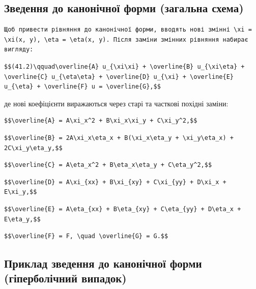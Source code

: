 \documentclass[
  ukrainian,
]{article}
\begin{document}
\subsection{Зведення до канонічної форми (загальна
схема)}\label{ux437ux432ux435ux434ux435ux43dux43dux44f-ux434ux43e-ux43aux430ux43dux43eux43dux456ux447ux43dux43eux457-ux444ux43eux440ux43cux438-ux437ux430ux433ux430ux43bux44cux43dux430-ux441ux445ux435ux43cux430}

\begin{verbatim}
Щоб привести рівняння до канонічної форми, вводять нові змінні \xi = \xi(x, y), \eta = \eta(x, y). Після заміни змінних рівняння набирає вигляду:
\end{verbatim}

\begin{verbatim}
$$(41.2)\qquad\overline{A} u_{\xi\xi} + \overline{B} u_{\xi\eta} + \overline{C} u_{\eta\eta} + \overline{D} u_{\xi} + \overline{E} u_{\eta} + \overline{F} u = \overline{G},$$
\end{verbatim}

де нові коефіцієнти виражаються через старі та часткові похідні заміни:

\begin{verbatim}
$$\overline{A} = A\xi_x^2 + B\xi_x\xi_y + C\xi_y^2,$$
\end{verbatim}

\begin{verbatim}
$$\overline{B} = 2A\xi_x\eta_x + B(\xi_x\eta_y + \xi_y\eta_x) + 2C\xi_y\eta_y,$$
\end{verbatim}

\begin{verbatim}
$$\overline{C} = A\eta_x^2 + B\eta_x\eta_y + C\eta_y^2,$$
\end{verbatim}

\begin{verbatim}
$$\overline{D} = A\xi_{xx} + B\xi_{xy} + C\xi_{yy} + D\xi_x + E\xi_y,$$
\end{verbatim}

\begin{verbatim}
$$\overline{E} = A\eta_{xx} + B\eta_{xy} + C\eta_{yy} + D\eta_x + E\eta_y,$$
\end{verbatim}

\begin{verbatim}
$$\overline{F} = F, \quad \overline{G} = G.$$
\end{verbatim}

\subsection{Приклад зведення до канонічної форми (гіперболічний
випадок)}\label{ux43fux440ux438ux43aux43bux430ux434-ux437ux432ux435ux434ux435ux43dux43dux44f-ux434ux43e-ux43aux430ux43dux43eux43dux456ux447ux43dux43eux457-ux444ux43eux440ux43cux438-ux433ux456ux43fux435ux440ux431ux43eux43bux456ux447ux43dux438ux439-ux432ux438ux43fux430ux434ux43eux43a}
\end{document}
